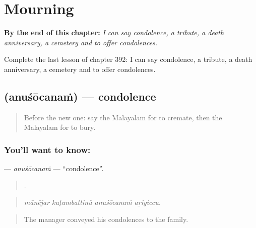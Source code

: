 
\chapter{Mourning}
\label{ch:ml-mourning}

\begin{chapteropening}
\textbf{By the end of this chapter:} \emph{I can say condolence, a tribute, a death anniversary, a cemetery and to offer condolences.}

Complete the last lesson of chapter 392: I can say condolence, a tribute, a death anniversary, a cemetery and to offer condolences.
\end{chapteropening}

\section[\texorpdfstring{\ml{അനുശോചനം} (anuśōcanaṁ)}{അനുശോചനം (anuśōcanaṁ)}]{ (anuśōcanaṁ) — condolence}

\label{lesson:ML-C392-anusocanam}



\begin{quote}
Before the new one: say the Malayalam for to cremate, then the Malayalam for to bury.
\end{quote}

\subsection*{You'll want to know: }
\textbf{} — \emph{anuśōcanaṁ} — \textquotedblleft{}condolence\textquotedblright{}.

\begin{quote}
   .
\end{quote}

\begin{quote}
\emph{mānējar kuṭumbattinŭ anuśōcanaṁ aṟiyiccu.}
\end{quote}

\begin{quote}
The manager conveyed his condolences to the family.
\end{quote}


